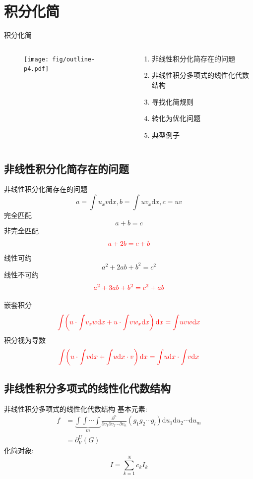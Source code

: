 \documentclass[handout]{beamer}
\newcommand{\dd}[1]{\mathrm{d}#1}
\newcommand{\red}[1]{{\color{red}#1}}
\begin{document}
\section{积分化简}
\begin{frame}{积分化简}
\begin{columns}
\begin{column}{0.4\textwidth}
  \begin{figure}
    \centering
    \texttt{[image: fig/outline-p4.pdf]}
  \end{figure}
\end{column}
\begin{column}{0.6\textwidth}
  \begin{enumerate}
  \item 非线性积分化简存在的问题
  \item 非线性积分多项式的线性化代数结构 
  \item 寻找化简规则 
  \item 转化为优化问题
  \item 典型例子 
  \end{enumerate}
\end{column}
\end{columns}
\end{frame}

\subsection{非线性积分化简存在的问题}
\begin{frame}{非线性积分化简存在的问题}
\[
    a=\int{u_x v \dd x},b=\int{u v_x \dd x},c=uv
\]
完全匹配
\[
    a+b=c
\]
非完全匹配
\[
    \red{a+2b=c+b}
\]
线性可约
\[
    a^2+2ab+b^2=c^2
\]
线性不可约
\[
    \red{a^2+3ab+b^2=c^2+ab}
\]
\end{frame}

\begin{frame}
嵌套积分
\[
    \red{\int\!{\left(u\cdot\int\!{v_xw\dd x}+u\cdot\int\!{vw_x\dd x}\right)\dd x}=\int\!{uvw\dd x}}
\]
积分视为导数
\[
    \red{\int\!{\left(u\cdot\int\!{v\dd x}+\int\!{u\dd x}\cdot v\right)\dd x}=\int\!{u\dd x}\cdot\int\!{v\dd x}}
\]
\end{frame}

\subsection{非线性积分多项式的线性化代数结构}
\begin{frame}{非线性积分多项式的线性化代数结构}
基本元素:
\[
\begin{aligned}
    f&=\underbrace{\int\!\int\!\cdots\!\int}_m{ \frac{\partial^n}{\partial v_1 \partial v_2 \cdots \partial v_n} (g_1 g_2 \cdots g_l)\dd u_1 \dd u_2 \cdots \dd u_m} \\ 
    &=\partial^U_V(G)
\end{aligned}
\]
化简对象:
\[
    I = \sum_{k=1}^N{c_k I_k}
\]
\end{frame}
\end{document}
